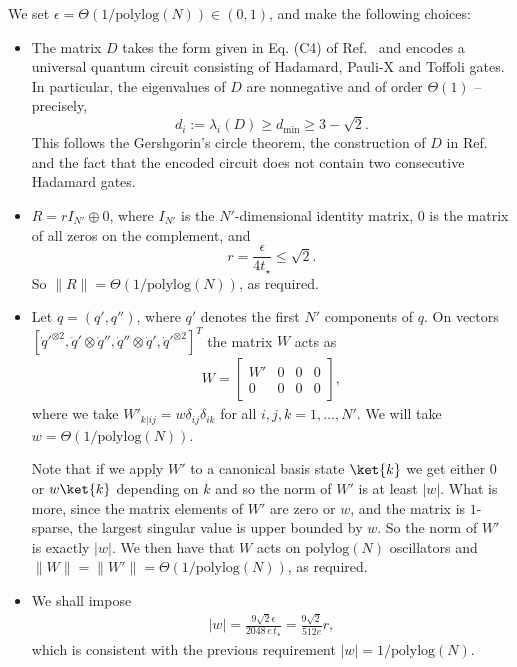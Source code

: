 \documentclass[superscriptaddress,onecolumn,nofootinbib,longbibliography,a4paper,accepted=2026-09-29]{quantumarticle}
\theoremstyle{plain}
\theoremstyle{definition}
\numberwithin{thm}{section}
\numberwithin{assumption}{section}
\numberwithin{lemma}{section}
\numberwithin{prop}{section}
\numberwithin{cor}{section}
\numberwithin{definition}{section}
\numberwithin{rmk}{section}
\numberwithin{equation}{section}
\begin{document}
We set $\epsilon = \Theta(1/\mathrm{polylog}(N)) \in (0,1)$, and make the following choices:
\begin{itemize}
\item The matrix $D$ takes the form given in Eq. (C4) of Ref.~\cite{babbush2023exponential} and encodes a universal quantum circuit consisting of Hadamard, Pauli-X and Toffoli gates.
In particular, the eigenvalues of $D$ are nonnegative and of order $\Theta(1)$ -- precisely, 
\begin{equation}
    d_i:=\lambda_i(D)  \geq d_{\mathrm{min}} \ge 3-\sqrt{2}.
\end{equation}
This follows the Gershgorin's circle theorem, the construction of $D$ in Ref.~\cite{babbush2023exponential} and the fact that the encoded circuit does not contain two consecutive Hadamard gates.

\item $R= r I_{N'} \oplus 0$, where  $I_{N'}$ is the $N'$-dimensional identity matrix, $0$ is the matrix of all zeros on the complement, and 
    \begin{equation}
        r= \frac{\epsilon}{4 t_\star} \leq \sqrt{2}.
    \end{equation} 
    So  $\|R\| =  \Theta(1/\mathrm{polylog}(N))$, as required.
    
\item Let $q = (q',q'')$, where $q'$ denotes the first $N'$ components of $q$. On vectors $[\dot{q}'^{\otimes 2}, \dot{q}' \otimes \dot{q}'', \dot{q}'' \otimes \dot{q}', \dot{q}'^{\otimes 2}]^T$ the matrix $W$ acts as
    \begin{align}
    \label{eq:Wmatrix}
        W= \begin{bmatrix}
            W' & 0 & 0 & 0\\
            0 & 0 & 0 & 0
        \end{bmatrix}, 
    \end{align}
    where we take $W'_{k|ij} = w \delta_{ij} \delta_{ik}$ for all $i,j,k= 1, \dots, N'$. We will take $w = \Theta(1/\mathrm{polylog}(N))$.
     
    Note that if we apply $W'$ to a canonical basis state $\ket{k}$ we get either $0$ or $w \ket{k}$ depending on $k$ and so the norm of $W'$ is at least $|w|$. What is more, since the matrix elements of $W'$ are zero or $w$, and the matrix is $1$-sparse, the largest singular value is upper bounded by $w$. So the norm of $W'$ is exactly $|w|$. We then have that $W$ acts on $\mathrm{polylog}(N)$ oscillators and $\|W\| = \|W'\| = \Theta(1/\mathrm{polylog}(N))$, as required.   

\item We shall impose
    \begin{align}
    \label{eq:wcondition}
        |w| = \frac{9\sqrt{2} \epsilon}{2048 \, e \, t_\star} = \frac{9\sqrt{2}}{512 e}r,
    \end{align}  
    which is consistent with the previous requirement $|w| = 1/\mathrm{polylog}(N)$.
\end{itemize}
\end{document}
